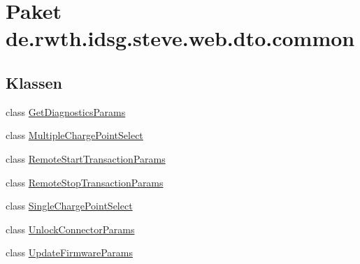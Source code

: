 \hypertarget{namespacede_1_1rwth_1_1idsg_1_1steve_1_1web_1_1dto_1_1common}{\section{Paket de.\-rwth.\-idsg.\-steve.\-web.\-dto.\-common}
\label{namespacede_1_1rwth_1_1idsg_1_1steve_1_1web_1_1dto_1_1common}
}
\subsection*{Klassen}
\begin{DoxyCompactItemize}
\item 
class \hyperlink{classde_1_1rwth_1_1idsg_1_1steve_1_1web_1_1dto_1_1common_1_1_get_diagnostics_params}{Get\-Diagnostics\-Params}
\item 
class \hyperlink{classde_1_1rwth_1_1idsg_1_1steve_1_1web_1_1dto_1_1common_1_1_multiple_charge_point_select}{Multiple\-Charge\-Point\-Select}
\item 
class \hyperlink{classde_1_1rwth_1_1idsg_1_1steve_1_1web_1_1dto_1_1common_1_1_remote_start_transaction_params}{Remote\-Start\-Transaction\-Params}
\item 
class \hyperlink{classde_1_1rwth_1_1idsg_1_1steve_1_1web_1_1dto_1_1common_1_1_remote_stop_transaction_params}{Remote\-Stop\-Transaction\-Params}
\item 
class \hyperlink{classde_1_1rwth_1_1idsg_1_1steve_1_1web_1_1dto_1_1common_1_1_single_charge_point_select}{Single\-Charge\-Point\-Select}
\item 
class \hyperlink{classde_1_1rwth_1_1idsg_1_1steve_1_1web_1_1dto_1_1common_1_1_unlock_connector_params}{Unlock\-Connector\-Params}
\item 
class \hyperlink{classde_1_1rwth_1_1idsg_1_1steve_1_1web_1_1dto_1_1common_1_1_update_firmware_params}{Update\-Firmware\-Params}
\end{DoxyCompactItemize}
